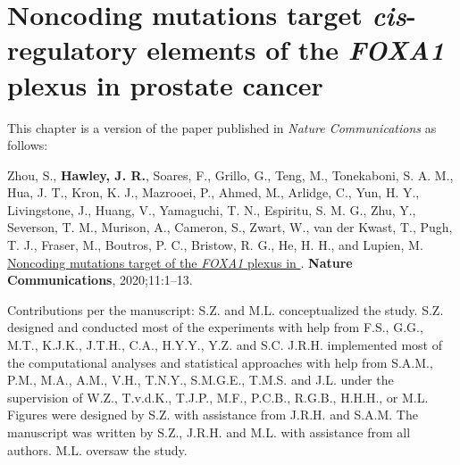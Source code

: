 \chapter{Noncoding mutations target \emph{cis}-regulatory elements of the \emph{FOXA1} plexus in prostate cancer}
\label{chap:FOXA1}

This chapter is a version of the paper published in \emph{Nature Communications} as follows:

Zhou, S., \textbf{Hawley, J. R.}, Soares, F., Grillo, G., Teng, M., Tonekaboni, S. A. M., Hua, J. T., Kron, K. J., Mazrooei, P., Ahmed, M., Arlidge, C., Yun, H. Y., Livingstone, J., Huang, V., Yamaguchi, T. N., Espiritu, S. M. G., Zhu, Y., Severson, T. M., Murison, A., Cameron, S., Zwart, W., van der Kwast, T., Pugh, T. J., Fraser, M., Boutros, P. C., Bristow, R. G., He, H. H., and Lupien, M.
\underline{Noncoding mutations target  of the \emph{FOXA1} plexus in }.
\textbf{Nature Communications}, 2020;11:1–13.

\vspace{1em}

Contributions per the manuscript:
S.Z. and M.L. conceptualized the study.
S.Z. designed and conducted most of the experiments with help from F.S., G.G., M.T., K.J.K., J.T.H., C.A., H.Y.Y., Y.Z. and S.C.
J.R.H. implemented most of the computational analyses and statistical approaches with
help from S.A.M., P.M., M.A., A.M., V.H., T.N.Y., S.M.G.E., T.M.S. and J.L. under the
supervision of W.Z., T.v.d.K., T.J.P., M.F., P.C.B., R.G.B., H.H.H., or M.L.
Figures were designed by S.Z. with assistance from J.R.H. and S.A.M.
The manuscript was written by S.Z., J.R.H. and M.L. with assistance from all authors. 
M.L. oversaw the study.







